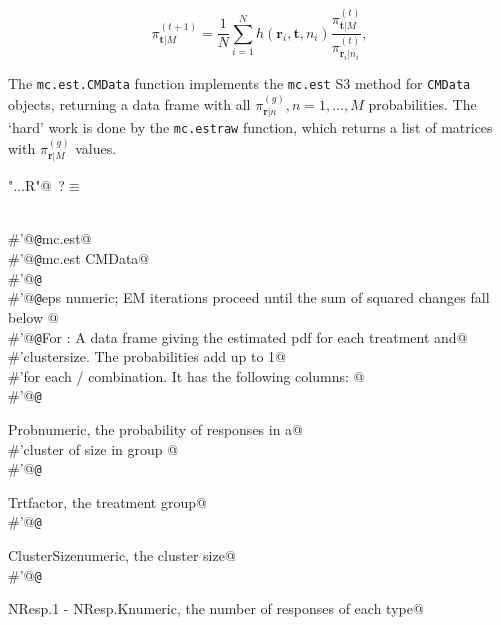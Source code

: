 \documentclass[reqno]{amsart}
\renewcommand{\NWtarget}[2]{\hypertarget{#1}{#2}}
\newcommand{\rvec}{\mathbf{r}}
\newcommand{\tvec}{\mathbf{t}}
\begin{document}
\begin{equation}\label{F:EMupdate0}
 \pi_{\tvec|M}^{(t+1)} = \frac{1}{N} \sum_{i=1}^{N} h(\rvec_{i},\tvec,n_{i})
             \frac{\pi^{(t)}_{\tvec|M}}{\pi^{(t)}_{\rvec_{i}|n_{i}}},
\end{equation}

The \texttt{mc.est.CMData} function implements the \texttt{mc.est} S3 method for \texttt{CMData} objects, 
returning a data frame with all  $\pi^{(g)}_{\rvec|n}, n=1,\ldots, M$ probabilities. The `hard' work is done
by the \texttt{mc.estraw} function, which returns a list of matrices with  $\pi^{(g)}_{\rvec|M}$ values.
\begin{flushleft} \small\label{scrap19}\raggedright\small
\NWtarget{nuweb?}{} \verb@"..\R\ExchMultinomial.R"@\nobreak\ {\footnotesize {?}}$\equiv$
\vspace{-1ex}
\begin{list}{}{} \item
\mbox{}\verb@@\\
\mbox{}\verb@#'@{\tt @}\verb@rdname mc.est@\\
\mbox{}\verb@#'@{\tt @}\verb@method mc.est CMData@\\
\mbox{}\verb@#'@{\tt @}\verb@export@\\
\mbox{}\verb@#'@{\tt @}\verb@param eps numeric; EM iterations proceed until the sum of squared changes fall below   @\\
\mbox{}\verb@#'@{\tt @}\verb@return For : A data frame giving the estimated pdf for each treatment and@\\
\mbox{}\verb@#'clustersize.  The probabilities add up to 1@\\
\mbox{}\verb@#'for each / combination. It has the following columns: @\\
\mbox{}\verb@#'@{\tt @}\verb@return \item{Prob}{numeric, the probability of  responses in a@\\
\mbox{}\verb@#'cluster of size  in group }@\\
\mbox{}\verb@#'@{\tt @}\verb@return \item{Trt}{factor, the treatment group}@\\
\mbox{}\verb@#'@{\tt @}\verb@return \item{ClusterSize}{numeric, the cluster size}@\\
\mbox{}\verb@#'@{\tt @}\verb@return \item{NResp.1 - NResp.K}{numeric, the number of responses of each type}@\\

\end{list}
\end{flushleft}
\end{document}
